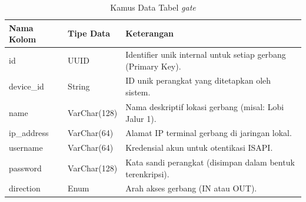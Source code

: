 \begin{table}[t]
    \centering
    \caption{Kamus Data Tabel \textit{gate}}
    \label{tab:kamus_gate}
    \begin{tabular}{|l|l|p{8cm}|}
        \hline
        \textbf{Nama Kolom} & \textbf{Tipe Data} & \textbf{Keterangan} \\
        \hline
        id & UUID & Identifier unik internal untuk setiap gerbang (Primary Key). \\
        \hline
        device\_id & String & ID unik perangkat yang ditetapkan oleh sistem. \\
        \hline
        name & VarChar(128) & Nama deskriptif lokasi gerbang (misal: Lobi Jalur 1). \\
        \hline
        ip\_address & VarChar(64) & Alamat IP terminal gerbang di jaringan lokal. \\
        \hline
        username & VarChar(64) & Kredensial akun untuk otentikasi ISAPI. \\
        \hline
        password & VarChar(128) & Kata sandi perangkat (disimpan dalam bentuk terenkripsi). \\
        \hline
        direction & Enum & Arah akses gerbang (IN atau OUT). \\
        \hline
    \end{tabular}
\end{table}